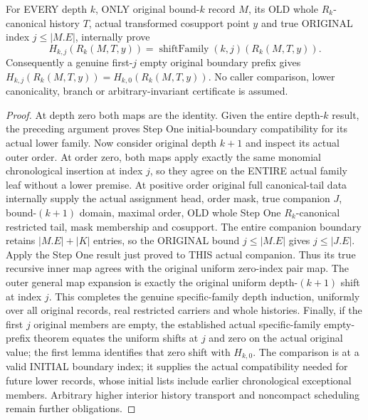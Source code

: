 \begin{theorem}
\label{hir:original-recursive-canonical-family-initial-boundary-compatibility}
\leanok
For EVERY depth $k$, ONLY original bound-$k$ record $M$, its OLD whole
$R_k$-canonical history $T$, actual transformed cosupport point $y$ and
true ORIGINAL index $j\leq |M.E|$, internally prove
\[
 H_{k,j}(R_k(M,T,y))=\operatorname{shiftFamily}(k,j)(R_k(M,T,y)).
\]
Consequently a genuine first-$j$ empty original boundary prefix gives
$H_{k,j}(R_k(M,T,y))=H_{k,0}(R_k(M,T,y))$.
No caller comparison, lower canonicality, branch or arbitrary-invariant
certificate is assumed.
\end{theorem}
\begin{proof}
At depth zero both maps are the identity. Given the entire depth-$k$ result,
the preceding argument proves Step One initial-boundary compatibility for
its actual lower family. Now consider original depth $k+1$ and inspect its
actual outer order. At order zero, both maps apply exactly the same
monomial chronological insertion at index $j$, so they agree on the ENTIRE
actual family leaf without a lower premise. At positive order original
full canonical-tail data internally supply the actual assignment head,
order mask, true companion $J$, bound-$(k+1)$ domain, maximal order, OLD
whole Step One $R_k$-canonical restricted tail, mask membership and cosupport.
The entire companion boundary retains $|M.E|+|K|$ entries, so the ORIGINAL
bound $j\leq |M.E|$ gives $j\leq |J.E|$. Apply the Step One result just
proved to THIS actual companion. Thus its true recursive inner map agrees
with the original uniform zero-index pair map. The outer general map
expansion is exactly the original uniform depth-$(k+1)$ shift at index $j$.
This completes the genuine specific-family depth induction, uniformly over
all original records, real restricted carriers and whole histories. Finally,
if the first $j$ original members are empty, the established actual
specific-family empty-prefix theorem equates the uniform shifts at $j$ and
zero on the actual original value; the first lemma identifies that zero
shift with $H_{k,0}$. The comparison is at a valid INITIAL boundary index;
it supplies the actual compatibility needed for future lower records, whose
initial lists include earlier chronological exceptional members. Arbitrary
higher interior history transport and noncompact scheduling remain further
obligations.
\end{proof}
